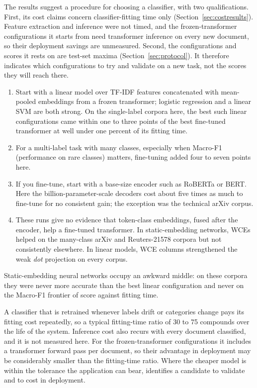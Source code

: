\documentclass{ijis}
\begin{document}
The results suggest a procedure for choosing a classifier, with two qualifications. First, its cost claims concern classifier-fitting time only (Section~\ref{sec:costresults}). Feature extraction and inference were not timed, and the frozen-transformer configurations it starts from need transformer inference on every new document, so their deployment savings are unmeasured. Second, the configurations and scores it rests on are test-set maxima (Section~\ref{sec:protocol}). It therefore indicates which configurations to try and validate on a new task, not the scores they will reach there.
\begin{enumerate}
\setlength\itemsep{1pt}
\item Start with a linear model over TF-IDF features concatenated with mean-pooled embeddings from a frozen transformer; logistic regression and a linear SVM are both strong. On the single-label corpora here, the best such linear configurations came within one to three points of the best fine-tuned transformer at well under one percent of its fitting time.
\item For a multi-label task with many classes, especially when Macro-F1 (performance on rare classes) matters, fine-tuning added four to seven points here.
\item If you fine-tune, start with a base-size encoder such as RoBERTa or BERT. Here the billion-parameter-scale decoders cost about five times as much to fine-tune for no consistent gain; the exception was the technical arXiv corpus.
\item These runs give no evidence that token-class embeddings, fused after the encoder, help a fine-tuned transformer. In static-embedding networks, WCEs helped on the many-class arXiv and Reuters-21578 corpora but not consistently elsewhere. In linear models, WCE columns strengthened the weak \emph{dot} projection on every corpus.
\end{enumerate}
Static-embedding neural networks occupy an awkward middle: on these corpora they were never more accurate than the best linear configuration and never on the Macro-F1 frontier of score against fitting time.

A classifier that is retrained whenever labels drift or categories change pays its fitting cost repeatedly, so a typical fitting-time ratio of 30 to 75 compounds over the life of the system. Inference cost also recurs with every document classified, and it is not measured here. For the frozen-transformer configurations it includes a transformer forward pass per document, so their advantage in deployment may be considerably smaller than the fitting-time ratio. Where the cheaper model is within the tolerance the application can bear,  identifies a candidate to validate and to cost in deployment.
\end{document}
